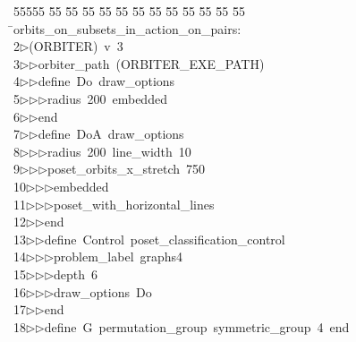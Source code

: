 %
%
\begin{tabbing}
55555 \= 55 \= 55 \= 55 \= 55 \= 55 \= 55 \= 55 \= 55 \= 55 \= 55 \= 55 \= 55 \= \>orbits\_on\_subsets\_in\_action\_on\_pairs:\\[0pt]
2\>$\triangleright$\>(ORBITER)\ v\ 3\ \\[0pt]
3\>$\triangleright$\>$\triangleright$\>orbiter\_path\ (ORBITER\_EXE\_PATH)\ \\[0pt]
4\>$\triangleright$\>$\triangleright$\>define\ Do\ draw\_options\ \\[0pt]
5\>$\triangleright$\>$\triangleright$\>$\triangleright$\>radius\ 200\ embedded\ \\[0pt]
6\>$\triangleright$\>$\triangleright$\>end\ \\[0pt]
7\>$\triangleright$\>$\triangleright$\>define\ DoA\ draw\_options\ \\[0pt]
8\>$\triangleright$\>$\triangleright$\>$\triangleright$\>radius\ 200\ line\_width\ 10\ \\[0pt]
9\>$\triangleright$\>$\triangleright$\>$\triangleright$\>poset\_orbits\_x\_stretch\ 750\ \\[0pt]
10\>$\triangleright$\>$\triangleright$\>$\triangleright$\>embedded\ \\[0pt]
11\>$\triangleright$\>$\triangleright$\>$\triangleright$\>poset\_with\_horizontal\_lines\ \\[0pt]
12\>$\triangleright$\>$\triangleright$\>end\ \\[0pt]
13\>$\triangleright$\>$\triangleright$\>define\ Control\ poset\_classification\_control\ \\[0pt]
14\>$\triangleright$\>$\triangleright$\>$\triangleright$\>problem\_label\ graphs4\ \\[0pt]
15\>$\triangleright$\>$\triangleright$\>$\triangleright$\>depth\ 6\ \\[0pt]
16\>$\triangleright$\>$\triangleright$\>$\triangleright$\>draw\_options\ Do\ \\[0pt]
17\>$\triangleright$\>$\triangleright$\>end\ \\[0pt]
18\>$\triangleright$\>$\triangleright$\>define\ G\ permutation\_group\ symmetric\_group\ 4\ end\ \\[0pt]

\end{tabbing}
